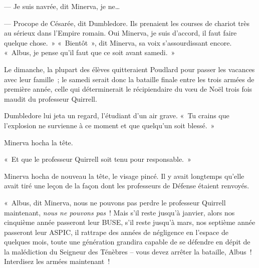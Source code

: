 --- Je suis navrée, dit Minerva, je ne…

--- Procope de Césarée\footnotemark{}, dit Dumbledore. Ils prenaient les courses de chariot très au sérieux dans l'Empire romain. Oui Minerva, je suis d'accord, il faut faire quelque chose.~»
«~Bientôt~», dit Minerva, sa voix s'assourdissant encore. «~Albus, je pense qu'il faut que ce soit avant samedi.~»

Le dimanche, la plupart des élèves quitteraient Poudlard pour passer les vacances avec leur famille~; le samedi serait donc la bataille finale entre les trois armées de première année, celle qui déterminerait le récipiendaire du vœu de Noël trois fois maudit du professeur Quirrell.

Dumbledore lui jeta un regard, l'étudiant d'un air grave. «~Tu crains que l'explosion ne survienne à ce moment et que quelqu'un soit blessé.~»

Minerva hocha la tête.

«~Et que le professeur Quirrell soit tenu pour responsable.~»

Minerva hocha de nouveau la tête, le visage pincé. Il y avait longtemps qu'elle avait tiré une leçon de la façon dont les professeurs de Défense étaient renvoyés.

«~Albus, dit Minerva, nous ne pouvons pas perdre le professeur Quirrell maintenant, \emph{nous ne pouvons pas}~! Mais s'il reste jusqu'à janvier, alors nos cinquième année passeront leur BUSE, s'il reste jusqu'à mars, nos septième année passeront leur ASPIC, il rattrape des années de négligence en l'espace de quelques mois, toute une génération grandira capable de se défendre en dépit de la malédiction du Seigneur des Ténèbres -- vous devez arrêter la bataille, Albus~! Interdisez les armées maintenant~!

